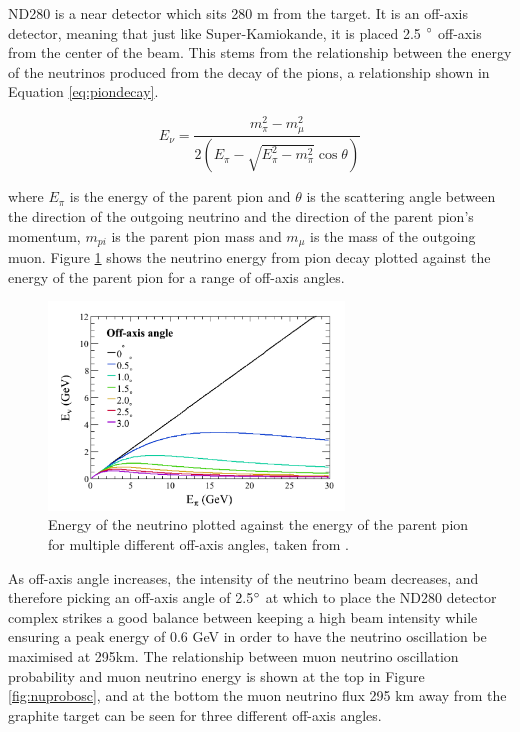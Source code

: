 ND280 is a near detector which sits 280 m from the target. It is an off-axis detector, meaning that just like Super-Kamiokande, it is placed 2.5 $\degree$ off-axis from the center of the beam. This stems from the relationship between the energy of the neutrinos produced from the decay of the pions, a relationship shown in Equation \ref{eq:piondecay}. 

\begin{equation}
    E_{\nu}=\frac{m_{\pi}^{2}-m_{\mu}^{2}}{2\left(E_{\pi}-\sqrt{E_{\pi}^{2}-m_{\pi}^{2}} \cos \theta\right)}
\label{eq:piondecay}
\end{equation}

where $E_{\pi}$ is the energy of the parent pion and $\theta$ is the scattering angle between the direction of the outgoing neutrino and the direction of the parent pion's momentum, $m_{pi}$ is the parent pion mass and $m_{\mu}$ is the mass of the outgoing muon. Figure \ref{fig:energyangle} shows the neutrino energy from pion decay plotted against the energy of the parent pion for a range of off-axis angles. 

\begin{figure}
\centering
\includegraphics[width=0.7\textwidth]{Figures/energy_angle.PNG}
\caption{Energy of the neutrino plotted against the energy of the parent pion for multiple different off-axis angles, taken from \cite{t2k_collaboration_t2k_2013}.}
\label{fig:energyangle}
\end{figure}

As off-axis angle increases, the intensity of the neutrino beam decreases, and therefore picking an off-axis angle of 2.5$\degree$ at which to place the ND280 detector complex strikes a good balance between keeping a high beam intensity while ensuring a peak energy of 0.6 GeV in order to have the neutrino oscillation be maximised at 295km. The relationship between muon neutrino oscillation probability and muon neutrino energy is shown at the top in Figure \ref{fig:nuprobosc}, and at the bottom the muon neutrino flux 295 km away from the graphite target can be seen for three different off-axis angles.

